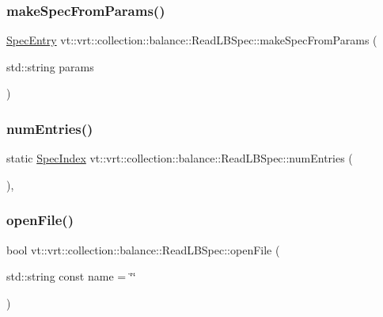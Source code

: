 \subsubsection{\texorpdfstring{make\+Spec\+From\+Params()}{makeSpecFromParams()}}
{\footnotesize\ttfamily \hyperlink{structvt_1_1vrt_1_1collection_1_1balance_1_1_spec_entry}{Spec\+Entry} vt\+::vrt\+::collection\+::balance\+::\+Read\+L\+B\+Spec\+::make\+Spec\+From\+Params (\begin{DoxyParamCaption}\item[{std\+::string}]{params }\end{DoxyParamCaption})\hspace{0.3cm}{\ttfamily [static]}}

\mbox{\label{structvt_1_1vrt_1_1collection_1_1balance_1_1_read_l_b_spec_ab7a988ed27206ee728474ad200c47291}} 
\subsubsection{\texorpdfstring{num\+Entries()}{numEntries()}}
{\footnotesize\ttfamily static \hyperlink{namespacevt_1_1vrt_1_1collection_1_1balance_a72a5e0d9936ddf57f8e6c64e0e9fd123}{Spec\+Index} vt\+::vrt\+::collection\+::balance\+::\+Read\+L\+B\+Spec\+::num\+Entries (\begin{DoxyParamCaption}{ }\end{DoxyParamCaption})\hspace{0.3cm}{\ttfamily [inline]}, {\ttfamily [static]}}

\mbox{\label{structvt_1_1vrt_1_1collection_1_1balance_1_1_read_l_b_spec_a17dc2fc7785cd6519440c080a472af05}} 
\subsubsection{\texorpdfstring{open\+File()}{openFile()}}
{\footnotesize\ttfamily bool vt\+::vrt\+::collection\+::balance\+::\+Read\+L\+B\+Spec\+::open\+File (\begin{DoxyParamCaption}\item[{std\+::string const}]{name = {\ttfamily \char`\"{}\char`\"{}} }\end{DoxyParamCaption})\hspace{0.3cm}{\ttfamily [static]}}

